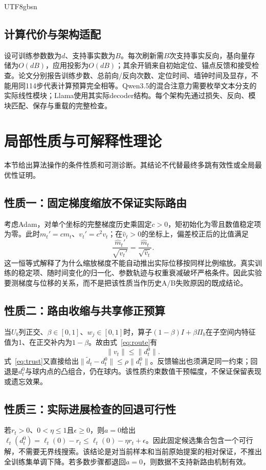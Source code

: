 \documentclass[sigconf,anonymous,review]{acmart}
\begin{document}
\begin{CJK*}{UTF8}{gbsn}
\subsection{计算代价与架构适配}
设可训练参数数为$d$、支持事实数为$B$。每次刷新需$B$次支持事实反向，基向量存储为$O(dB)$，应用投影为$O(dB)$；其余开销来自初始定位、锚点反馈和接受检查。论文分别报告训练步数、总前向/反向次数、定位时间、墙钟时间及显存，不能用同114步代表计算预算完全相等。Qwen3.5的混合注意力需要枚举文本分支的实际线性模块；Llama使用其实际decoder结构。每个架构先通过损失、反向、模块匹配、保存与重载的完整检查。

\section{局部性质与可解释性理论}
\label{sec:theory}
本节给出算法操作的条件性质和可测诊断。其结论不代替最终多跳有效性或全局最优性证明。

\subsection{性质一：固定梯度缩放不保证实际路由}
考虑Adam\cite{adam}，对单个坐标的完整梯度历史乘固定$c>0$，矩初始化为零且数值稳定项为零。此时$m_t'=cm_t$、$v_t'=c^2v_t$；在$\widehat v_t>0$的坐标上，偏差校正后的比值满足
\begin{equation}
 \frac{\widehat m_t'}{\sqrt{\widehat v_t'}}=
 \frac{\widehat m_t}{\sqrt{\widehat v_t}}.
\end{equation}
这一恒等式解释了为什么缩放梯度不能自动推出实际位移按同样比例缩放。真实训练的稳定项、随时间变化的归一化、参数轨迹与权重衰减破坏严格条件。因此实验要测梯度与位移的关系，而不是把该性质当作历史A/B失败原因的既成结论。

\subsection{性质二：路由收缩与共享修正预算}
当$U_b$列正交、$\beta\in[0,1]$、$w_j\in[0,1]$时，算子$(1-\beta)I+\beta\Pi_b$在子空间内特征值为1、在正交补内为$1-\beta$。故由式~\eqref{eq:route}有
\begin{equation}
 \|v_t\|\leq\|d_t^0\|.
\end{equation}
式~\eqref{eq:trust}又直接给出$\|\widetilde d_t-d_t^0\|\leq\rho\|d_t^0\|$。反馈输出也须满足同一约束；回退是$d_t^0$与球内点的凸组合，仍在球内。该性质约束数值干预幅度，不保证保留表现或遗忘效果。

\subsection{性质三：实际进展检查的回退可行性}
若$r_t>0$、$0<\eta\leq1$且$\epsilon\geq0$，则$a=0$给出$\ell_t(d_t^0)=\ell_t(0)-r_t\leq\ell_t(0)-\eta r_t+\epsilon$。因此固定候选集合包含一个可行解，不需要无界线搜索。该结论是对当前样本和当前原始提案的相对保证，不推出全训练集单调下降。若多数步骤都退回$a=0$，则数据不支持新路由机制有效。


\end{CJK*}
\end{document}
